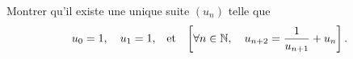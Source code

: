 \documentclass{magnolia}
\begin{document}


Montrer qu'il existe une unique suite $(u_n)$ telle que
\[u_0=1,\quad u_1=1, \quad\!\text{et}\quad\! \left[\forall n\in\mathbb{N},\quad u_{n+2}=\frac{1}{u_{n+1}}+u_n\right].\]

\end{document}
